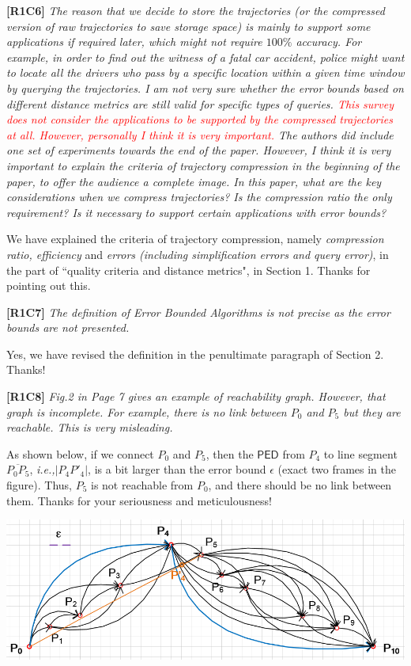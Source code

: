 \documentclass{letter}
\newcommand{\kw}[1]{{\ensuremath {\mathsf{#1}}}\xspace}
\newcommand{\ie}{\emph{i.e.,}\xspace}
\begin{document}
\textbf{[R1C6]} \emph{ The reason that we decide to store the trajectories (or the compressed version of raw trajectories to save storage space) is mainly to support some applications if required later, which might not require $100\%$ accuracy. For example, in order to find out the witness of a fatal car accident, police might want to locate all the drivers who pass by a specific location within a given time window by querying the trajectories. I am not very sure whether the error bounds based on different distance metrics are still valid for specific types of queries. \textcolor{red}{This survey does not consider the applications to be supported by the compressed trajectories at all. However, personally I think it is very important.} The authors did include one set of experiments towards the end of the paper. However, I think it is very important to explain the criteria of trajectory compression in the beginning of the paper, to offer the audience a complete image. In this paper, what are the key considerations when we compress trajectories? Is the compression ratio the only requirement? Is it necessary to support certain applications with error bounds? }

We have explained the criteria of trajectory compression, namely \emph{compression ratio, efficiency} and \emph{errors (including simplification errors and query error)}, in the part of ``quality criteria and distance metrics", in Section 1. Thanks for pointing out this.

\textbf{[R1C7]} \emph{ The definition of Error Bounded Algorithms is not precise as the error bounds are not presented. }

Yes, we have revised the definition in the penultimate paragraph of Section 2. Thanks!


\textbf{[R1C8]} \emph{ Fig.2 in Page 7 gives an example of reachability graph. However, that graph is incomplete. For example, there is no link between $P_0$ and $P_5$ but they are reachable. This is very misleading. }

As shown below, if we connect $P_0$ and $P_5$, then the \kw{PED} from $P_4$ to line segment $\overline{P_0P_5}$, \ie $|P_4P'_4|$, is a bit larger than the error bound $\epsilon$ (exact two frames in the figure). Thus, $P_5$ is not reachable from $P_0$, and there should be no link between them. Thanks for your seriousness and meticulousness!

\begin{center}
	\includegraphics[scale=0.75]{reachgraph.png}
	\label{fig:rgraph}
\end{center}
\end{document}
